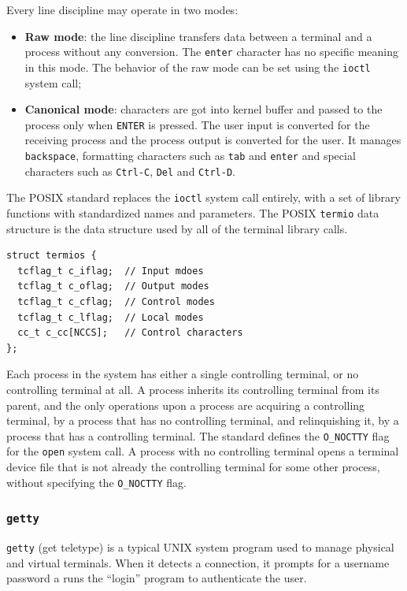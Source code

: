 Every line discipline may operate in two modes:
\begin{itemize}
\item \textbf{Raw mode}: the line discipline transfers data between a terminal and a process without any conversion. The \texttt{enter} character has no specific meaning in this mode. The behavior of the raw mode can be set using the \texttt{ioctl} system call;
\item \textbf{Canonical mode}: characters are got into kernel buffer and passed to the process only when \texttt{ENTER} is pressed. The user input is converted for the receiving process and the process output is converted for the user. It manages \texttt{backspace}, formatting characters such as \texttt{tab} and \texttt{enter} and special characters such as \texttt{Ctrl-C}, \texttt{Del} and \texttt{Ctrl-D}.
\end{itemize}

The POSIX standard replaces the \texttt{ioctl} system call entirely, with a set of library functions with standardized names and parameters. The POSIX \texttt{termio} data structure is the data structure used by all of the terminal library calls.
\begin{verbatim}
struct termios {
  tcflag_t c_iflag;  // Input mdoes
  tcflag_t c_oflag;  // Output modes
  tcflag_t c_cflag;  // Control modes
  tcflag_t c_lflag;  // Local modes
  cc_t c_cc[NCCS];   // Control characters
};
\end{verbatim}
Each process in the system has either a single controlling terminal, or no controlling terminal at all. A process inherits its controlling terminal from its parent, and the only operations upon a process are acquiring a controlling terminal, by a process that has no controlling terminal, and relinquishing it, by a process that has a controlling terminal. The standard defines the \texttt{O\_NOCTTY} flag for the \texttt{open} system call. A process with no controlling terminal opens a terminal device file that is not already the controlling terminal for some other process, without specifying the \texttt{O\_NOCTTY} flag.

\subsubsection{\texttt{getty}}
\texttt{getty} (get teletype) is a typical UNIX system program used to manage physical and virtual terminals. When it detects a connection, it prompts for a username password a runs the ``login'' program to authenticate the user.


